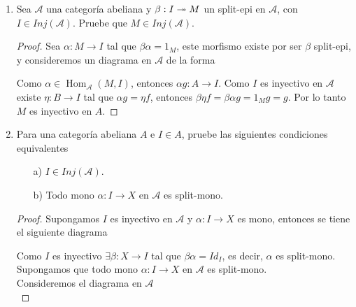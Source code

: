 \documentclass{article}
\begin{document}
\begin{enumerate}[label=\textbf{Ej \arabic*.}]
\begin{proof}
\end{proof}

\item Sea $\mathscr{A}$ una categoría abeliana y $\catarrow{\beta}{I}{M}{e}$ un split-epi en $\mathscr{A}$, con \\
$I\in Inj(\mathscr{A})$. Pruebe que $M\in Inj(\mathscr{A})$.

\begin{proof}
Sea $\alpha:M\to I$ tal que $\beta\alpha=1_M$, este morfismo existe por ser $\beta$ split-epi, y consideremos un diagrama en $\mathscr{A}$ de la
forma\\

\centerline{
}
Como $\alpha\in  \operatorname{Hom}_\mathscr{A}(M,I)$, entonces $\alpha g:A\to I$. Como $I$ es inyectivo en $\mathscr{A}$ existe 
$\eta:B\to I$ tal que $\alpha g=\eta f$, entonces $\beta\eta f=\beta\alpha g=1_M g=g.$ Por lo tanto $M$ es inyectivo en $A$.

\end{proof}

\item Para una categoría abeliana $A$ e $I\in A$, pruebe las siguientes condiciones equivalentes

\begin{itemize}
\item[a)] $I\in Inj(\mathscr{A})$.
\item[b)] Todo mono $\alpha:I\to X$ en $\mathscr{A}$ es split-mono.
\end{itemize}

\begin{proof}
 Supongamos $I$ es inyectivo en $\mathscr{A}$ y $\alpha:I\to X$ es mono, entonces se tiene el siguiente diagrama\\

\centerline{
}

Como $I$ es inyectivo $\exists \beta:X\to I$ tal que $\beta\alpha=Id_I$, es decir, $\alpha$ es split-mono.\\

 Supongamos que todo mono $\alpha:I\to X$ en $\mathscr{A}$ es split-mono.\\

Consideremos el diagrama en $\mathscr{A}$\\


\end{proof}
\end{enumerate}
\end{document}
